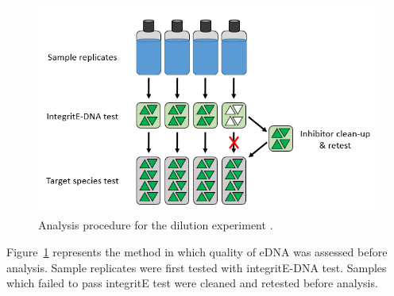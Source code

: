 \vspace{5mm}

\begin{figure}[H]
\includegraphics{Chapter4Images/flowprocedure.png}
\caption{Analysis procedure for the dilution experiment \citep{berg}.}
\label{fig:flowprocedure}
\end{figure}

Figure~\ref{fig:flowprocedure} represents the method in which quality of eDNA was assessed  before analysis. Sample replicates were first tested with integritE-DNA test. Samples which failed to pass integritE test were cleaned and retested before analysis.



